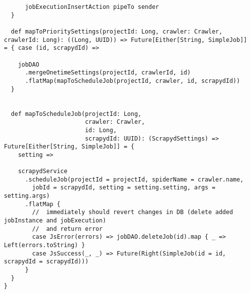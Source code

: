 \begin{lstlisting}
      jobExecutionInsertAction pipeTo sender
  }

  def mapToPrioritySettings(projectId: Long, crawler: Crawler, crawlerId: Long): ((Long, UUID)) => Future[Either[String, SimpleJob]] = { case (id, scrapydId) =>

    jobDAO
      .mergeOnetimeSettings(projectId, crawlerId, id)
      .flatMap(mapToScheduleJob(projectId, crawler, id, scrapydId))
  }


  def mapToScheduleJob(projectId: Long,
                       crawler: Crawler,
                       id: Long,
                       scrapydId: UUID): (ScrapydSettings) => Future[Either[String, SimpleJob]] = {
    setting =>

    scrapydService
      .scheduleJob(projectId = projectId, spiderName = crawler.name,
        jobId = scrapydId, setting = setting.setting, args = setting.args)
      .flatMap {
        //  immediately should revert changes in DB (delete added jobInstance and jobExecution)
        //  and return error
        case JsError(errors) => jobDAO.deleteJob(id).map { _ => Left(errors.toString) }
        case JsSuccess(_, _) => Future(Right(SimpleJob(id = id, scrapydId = scrapydId)))
      }
  }
}
\end{lstlisting}
